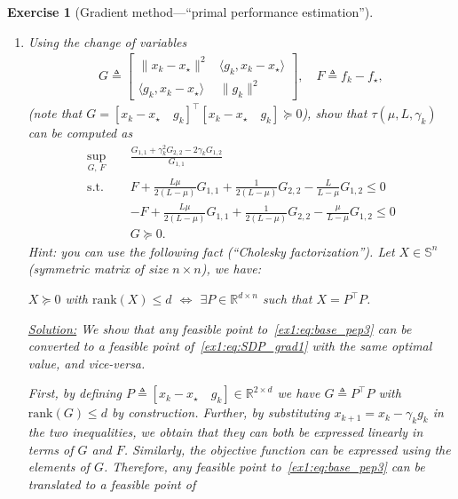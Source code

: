 \documentclass[11pt,a4paper]{article}
\newcommand{\correction}[1]{{{\color{blue}\underline{Solution:} #1}}}
\newcommand{\correction}[1]{}
\newtheorem{exercise}{Exercise}
\begin{document}
\begin{exercise}[Gradient method---``primal performance estimation'']
\begin{enumerate}
	\correction{From , there exists an $L$-smooth $\mu$-strongly convex function satisfying $g_k=\nabla f(x_k)$, $g_\star=\nabla f(x_\star)$, $f_k=f(x_k)$ and $f_\star=f(x_\star)$ if and only if those inequalities are satisfied. Hence any feasible point to~\eqref{ex1:eq:base_pep3} can be converted to a feasible point to~\eqref{ex1:eq:base_pep2} and vice-versa (\Cref{thm:interp_smoothstronglyconvex} provides necessary and sufficient conditions).}
	\item Using the change of variables
			\begin{align}\label{ex1:eq:GRAM}
			G \triangleq \begin{bmatrix}
			\|x_k-x_\star\|^2 & \langle g_k,x_k-x_\star\rangle\\
			\langle g_k, x_k-x_\star\rangle & \| g_k\|^2
			\end{bmatrix},\quad 	F \triangleq 			f_k-f_\star,
			\end{align}
			(note that $G=[x_k-x_\star \quad g_k]^\top [x_k-x_\star \quad g_k]\succcurlyeq 0$), show that $\tau(\mu,L,\gamma_k)$ can be computed as
			\begin{equation}\label{ex1:eq:SDP_grad1}
			\begin{aligned}
			\sup_{G,\, F} \quad & \frac{G_{1,1}+\gamma_k ^2 G_{2,2}-2\gamma_k G_{1,2}}{G_{1,1}}\\
			\text{s.t. } \quad & F + \tfrac{L\mu}{2(L-\mu)} G_{1,1}+\tfrac{1}{2(L-\mu)}G_{2,2}-\tfrac{L}{L-\mu}G_{1,2}\leqslant 0\\
			&-F + \tfrac{L\mu}{2(L-\mu)} G_{1,1}+\tfrac{1}{2(L-\mu)}G_{2,2}-\tfrac{\mu}{L-\mu}G_{1,2}\leqslant 0\\
			&G\succcurlyeq 0.
			\end{aligned}
			\end{equation}
	Hint: you can use the following fact (``Cholesky factorization''). Let $X\in \mathbb{S}^n$ (symmetric matrix of size $n\times n$), we have:
	\begin{center}
	$X\succcurlyeq 0$ with $\mathrm{rank}(X)\leqslant d$ $\Leftrightarrow$ $\exists P\in\mathbb{R}^{d\times n}$ such that $X=P^\top\! P$.
	\end{center}
	
	
	\correction{We show that any feasible point to~\eqref{ex1:eq:base_pep3} can be converted to a feasible point of~\eqref{ex1:eq:SDP_grad1} with the same optimal value, and vice-versa.
	
	First, by defining $P\triangleq[x_k-x_\star \quad g_k]\in\mathbb{R}^{2\times d}$ we have $G\triangleq P^{\top\!}P$ with $\mathrm{rank}(G)\leq d$ by construction. Further, by substituting $x_{k+1}=x_k-\gamma_k g_k$ in the two inequalities, we obtain that they can both be expressed linearly in terms of $G$ and $F$. Similarly, the objective function can be expressed using the elements of $G$. Therefore, any feasible point to~\eqref{ex1:eq:base_pep3} can be translated to a feasible point of

}
\end{enumerate}
\end{exercise}
\end{document}
